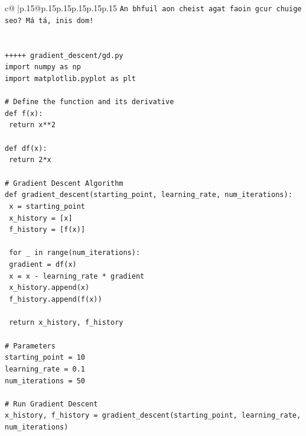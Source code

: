 \documentclass{article}
\begin{document}
{\begin{supertabular}{c@{$\;$}|p{.15\linewidth}@{}p{.15\linewidth}p{.15\linewidth}p{.15\linewidth}p{.15\linewidth}p{.15\linewidth}}
{{{\texttt{An bhfuil aon cheist agat faoin gcur chuige seo? Má tá, inis dom!} \\
\\ 
\\ 
\texttt{+++++ gradient\_descent/gd.py} \\
\texttt{import numpy as np} \\
\texttt{import matplotlib.pyplot as plt} \\
\\ 
\texttt{\# Define the function and its derivative} \\
\texttt{def f(x):} \\
\texttt{    return x**2} \\
\\ 
\texttt{def df(x):} \\
\texttt{    return 2*x} \\
\\ 
\texttt{\# Gradient Descent Algorithm} \\
\texttt{def gradient\_descent(starting\_point, learning\_rate, num\_iterations):} \\
\texttt{    x = starting\_point} \\
\texttt{    x\_history = {[}x{]}} \\
\texttt{    f\_history = {[}f(x){]}} \\
\\ 
\texttt{    for \_ in range(num\_iterations):} \\
\texttt{        gradient = df(x)} \\
\texttt{        x = x {-} learning\_rate * gradient} \\
\texttt{        x\_history.append(x)} \\
\texttt{        f\_history.append(f(x))} \\
\\ 
\texttt{    return x\_history, f\_history} \\
\\ 
\texttt{\# Parameters} \\
\texttt{starting\_point = 10} \\
\texttt{learning\_rate = 0.1} \\
\texttt{num\_iterations = 50} \\
\\ 
\texttt{\# Run Gradient Descent} \\
\texttt{x\_history, f\_history = gradient\_descent(starting\_point, learning\_rate, num\_iterations)} \\
\\ 
}}}
\end{supertabular}}
\end{document}
